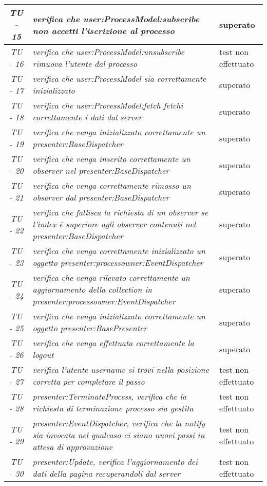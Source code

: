 \begin{small}\centering
\begin{tabular}{|c|p{8.0cm}|p{2.0cm}|}
\hline
\textit{TU - 15} &
\textit{verifica che user:ProcessModel:subscribe non accetti l'iscrizione al processo} &  superato\\
\hline
\textit{TU - 16} &
\textit{verifica che user:ProcessModel:unsubscribe rimuova l'utente dal processo} &  test non effettuato\\
\hline
\textit{TU - 17} &
\textit{verifica che user:ProcessModel sia correttamente inizializzato} & superato \\
\hline
\textit{TU - 18} &
\textit{verifica che user:ProcessModel:fetch fetchi correttamente i dati dal server } & superato \\
\hline
\textit{TU - 19} &
\textit{verifica che venga inizializzato correttamente un presenter:BaseDispatcher} & superato \\
\hline
\textit{TU - 20} &
\textit{ verifica che venga inserito correttamente un observer nel presenter:BaseDispatcher } & superato \\
\hline
\textit{TU - 21} &
\textit{ verifica che venga correttamente rimosso un observer dal presenter:BaseDispatcher} & superato \\
\hline
\textit{TU - 22} &
\textit{ verifica che fallisca la richiesta di un observer se l'index è superiore agli observer contenuti nel presenter:BaseDispatcher} & superato \\
\hline
\textit{TU - 23} &
\textit{verifica che venga correttamente inizializzato un oggetto presenter:processowner:EventDispatcher } & superato \\
\hline
\textit{TU - 24} &
\textit{verifica che venga rilevato correttamente un aggiornamento della collection in presenter:processowner:EventDispatcher} & superato \\
\hline
\textit{TU - 25} &
\textit{verifica che venga inizializzato correttamente un oggetto presenter:BasePresenter } & superato \\
\hline
\textit{TU - 26} &
\textit{verifica che venga effettuata correttamente la logout } & superato \\
\hline
\textit{TU - 27} &
\textit{verifica l'utente username si trovi nella posizione corretta per completare il passo } & test non effettuato \\
\hline
\textit{TU - 28} &
\textit{presenter:TerminateProcess, verifica che la richiesta di terminazione processo sia gestita } & test non effettuato \\
\hline
\textit{TU - 29} &
\textit{presenter:EventDispatcher, verifica che la notify sia invocata nel qualcaso ci siano nuovi passi in attesa di approvazione } & test non effettuato \\
\hline
\textit{TU - 30} &
\textit{presenter:Update, verifica l'aggiornamento dei dati della pagina recuperandoli dal server} & test non effettuato \\
\hline
\end{tabular}\\
\end{small}